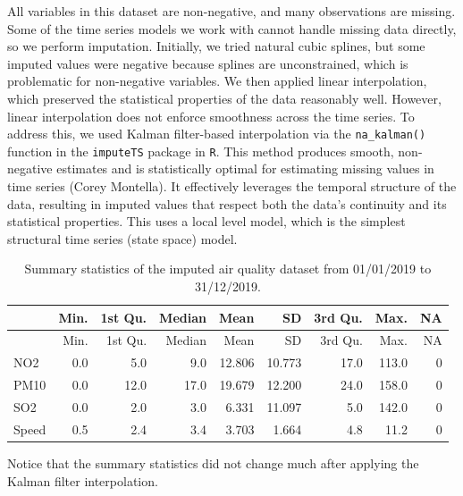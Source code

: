 \documentclass[
]{article}
\begin{document}
All variables in this dataset are non-negative, and many observations
are missing. Some of the time series models we work with cannot handle
missing data directly, so we perform imputation. Initially, we tried
natural cubic splines, but some imputed values were negative because
splines are unconstrained, which is problematic for non-negative
variables. We then applied linear interpolation, which preserved the
statistical properties of the data reasonably well. However, linear
interpolation does not enforce smoothness across the time series. To
address this, we used Kalman filter-based interpolation via the
\texttt{na\_kalman()} function in the \texttt{imputeTS} package in
\texttt{R}. This method produces smooth, non-negative estimates and is
statistically optimal for estimating missing values in time series
(Corey Montella). It effectively leverages the temporal structure of the
data, resulting in imputed values that respect both the data's
continuity and its statistical properties. This uses a local level
model, which is the simplest structural time series (state space) model.

\begin{longtable}[]{@{}lrrrrrrrr@{}}
\caption{Summary statistics of the imputed air quality dataset from
01/01/2019 to 31/12/2019.}\tabularnewline
\toprule\noalign{}
& Min. & 1st Qu. & Median & Mean & SD & 3rd Qu. & Max. & NA \\
\midrule\noalign{}
\endfirsthead
\toprule\noalign{}
& Min. & 1st Qu. & Median & Mean & SD & 3rd Qu. & Max. & NA \\
\midrule\noalign{}
\endhead
\bottomrule\noalign{}
\endlastfoot
NO2 & 0.0 & 5.0 & 9.0 & 12.806 & 10.773 & 17.0 & 113.0 & 0 \\
PM10 & 0.0 & 12.0 & 17.0 & 19.679 & 12.200 & 24.0 & 158.0 & 0 \\
SO2 & 0.0 & 2.0 & 3.0 & 6.331 & 11.097 & 5.0 & 142.0 & 0 \\
Speed & 0.5 & 2.4 & 3.4 & 3.703 & 1.664 & 4.8 & 11.2 & 0 \\
\end{longtable}

Notice that the summary statistics did not change much after applying
the Kalman filter interpolation.
\end{document}
